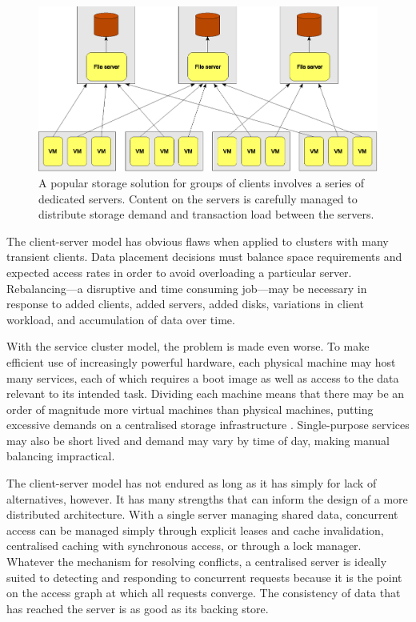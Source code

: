 \begin{figure}[tp]
\centering
\includegraphics[width=\figwidth]{figures/client-server}
\caption[Machines served by a series of client-server file systems]{A popular storage solution for groups of clients involves a series of dedicated servers. Content on the servers is carefully managed to distribute storage demand and transaction load between the servers.}
\label{fig:client-server}
\end{figure}

The client-server model has obvious flaws when applied to clusters with many transient clients. Data placement decisions must balance space requirements and expected access rates in order to avoid overloading a particular server. Rebalancing---a disruptive and time consuming job---may be necessary in response to added clients, added servers, added disks, variations in client workload, and accumulation of data over time.

With the service cluster model, the problem is made even worse. To make efficient use of increasingly powerful hardware, each physical machine may host many services, each of which requires a boot image as well as access to the data relevant to its intended task. Dividing each machine means that there may be an order of magnitude more virtual machines than physical machines, putting excessive demands on a centralised storage infrastructure \cite{hospodor}. Single-purpose services may also be short lived and demand may vary by time of day, making manual balancing impractical.

The client-server model has not endured as long as it has simply for lack of alternatives, however. It has many strengths that can inform the design of a more distributed architecture. With a single server managing shared data, concurrent access can be managed simply through explicit leases and cache invalidation, centralised caching with synchronous access, or through a lock manager. Whatever the mechanism for resolving conflicts, a centralised server is ideally suited to detecting and responding to concurrent requests because it is the point on the access graph at which all requests converge. The consistency of data that has reached the server is as good as its backing store.

